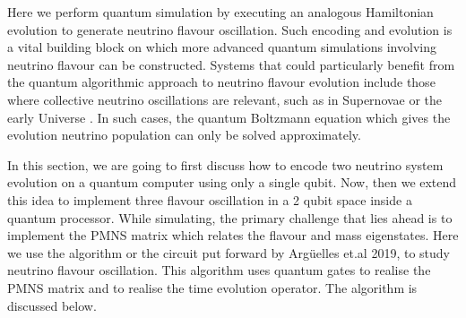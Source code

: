\documentclass[12pt,a4paper]{report}
\begin{document}
Here we perform quantum simulation by executing an analogous Hamiltonian evolution to generate neutrino flavour oscillation. Such encoding and evolution is a vital building block on which more advanced quantum simulations involving neutrino flavour can be constructed. Systems that could particularly benefit from the quantum algorithmic approach to neutrino flavour evolution include those where collective neutrino oscillations are relevant, such as in Supernovae or the early Universe \cite{jones}. In such cases, the quantum Boltzmann equation which gives the evolution neutrino population can only be solved approximately. \par
In this section, we are going to first discuss how to encode two neutrino system evolution on a quantum computer using only a single qubit. Now, then we extend this idea to implement three flavour oscillation in a 2 qubit space inside a quantum processor. While simulating, the primary challenge that lies ahead is to implement the PMNS matrix which relates the flavour and mass eigenstates. Here we use the algorithm or the circuit put forward by Arg\"uelles et.al 2019, to study neutrino flavour oscillation. This algorithm uses quantum gates to realise the PMNS matrix and to realise the time evolution operator. The algorithm is discussed below.
\end{document}
